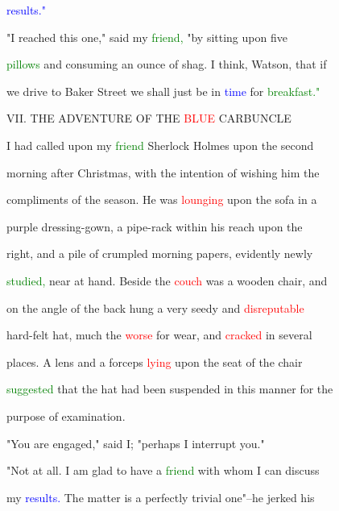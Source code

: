  \textcolor{blue}{results."}



 "I reached this one," said my \textcolor{green}{friend,} "by sitting upon five

 \textcolor{green}{pillows} and consuming an ounce of shag. I think, Watson, that if

 we drive to Baker Street we shall just be in \textcolor{blue}{time} for \textcolor{green}{breakfast."}







 VII. THE \textcolor{BurntOrange}{ADVENTURE} OF THE \textcolor{red}{BLUE} CARBUNCLE



 I had called upon my \textcolor{green}{friend} Sherlock Holmes upon the second

 morning after Christmas, with the intention of wishing him the

 \textcolor{BurntOrange}{compliments} of the season. He was \textcolor{red}{lounging} upon the sofa in a

 purple dressing-gown, a pipe-rack within his reach upon the

 right, and a pile of crumpled morning papers, evidently newly

 \textcolor{green}{studied,} near at hand. Beside the \textcolor{red}{couch} was a wooden chair, and

 on the angle of the back hung a very seedy and \textcolor{red}{disreputable}

 hard-felt hat, much the \textcolor{red}{worse} for \textcolor{BurntOrange}{wear,} and \textcolor{red}{cracked} in several

 places. A lens and a forceps \textcolor{red}{lying} upon the seat of the chair

 \textcolor{green}{suggested} that the hat had been suspended in this manner for the

 purpose of \textcolor{BurntOrange}{examination.}



 "You are engaged," said I; "perhaps I \textcolor{BurntOrange}{interrupt} you."



 "Not at all. I am \textcolor{BurntOrange}{glad} to have a \textcolor{green}{friend} with whom I can discuss

 my \textcolor{blue}{results.} The matter is a perfectly trivial one"--he jerked his

